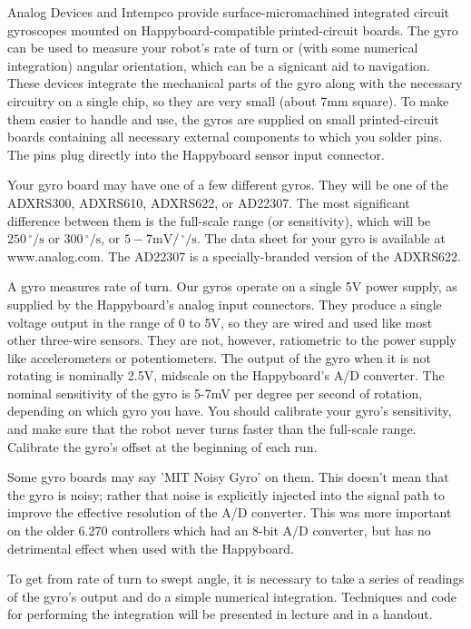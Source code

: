 Analog Devices and Intempco provide surface-micromachined integrated circuit gyroscopes mounted 
on Happyboard-compatible printed-circuit boards. The gyro can be used to measure your robot's 
rate of turn or (with some numerical integration) angular orientation, which can be a signicant
aid to navigation. These devices integrate the mechanical parts of the gyro along with the
necessary circuitry on a single chip, so they are very small (about 7mm square). To make them
easier to handle and use, the gyros are supplied on small printed-circuit boards
containing all necessary external components to which you solder pins.  The pins plug directly
into the Happyboard sensor input connector.

Your gyro board may have one of a few different gyros.  They will be one of the ADXRS300, ADXRS610,
ADXRS622, or AD22307.  The most significant difference between them is the full-scale range (or
sensitivity), which will be $250\,^{\circ}\mathrm{/s}$ or $300\,^{\circ}\mathrm{/s}$, or $5-7\mathrm{mV/}\,^{\circ}\mathrm{/s}$.  The data sheet for your gyro is 
available at www.analog.com.  The AD22307 is a specially-branded version of the ADXRS622. 

A gyro measures rate of turn.  Our gyros operate on a single 5V power supply, as supplied by the
Happyboard's analog input connectors.  They produce a single voltage output in the range of 0 to 5V,
so they are wired and used like most other three-wire sensors. They are not, however, ratiometric to
the power supply like accelerometers or potentiometers. The output of the gyro when
it is not rotating is nominally 2.5V, midscale on the Happyboard's A/D converter. The
nominal sensitivity of the gyro is 5-7mV per degree per second of rotation, depending on which
gyro you have. You should calibrate your gyro's sensitivity, and make sure that the robot never
turns faster than the full-scale range.  Calibrate the gyro's offset at the beginning of each run.

Some gyro boards may say 'MIT Noisy Gyro' on them.  This doesn't mean that the gyro is noisy; rather 
that noise is explicitly injected into the signal path to improve the effective resolution of the A/D 
converter.  This was more important on the older 6.270 controllers which had an
8-bit A/D converter, but has no detrimental effect when used with the Happyboard.

To get from rate of turn to swept angle, it is necessary to take a series of readings 
of the gyro's output and do a simple numerical integration. Techniques and code for 
performing the integration will be presented in lecture and in a handout.


